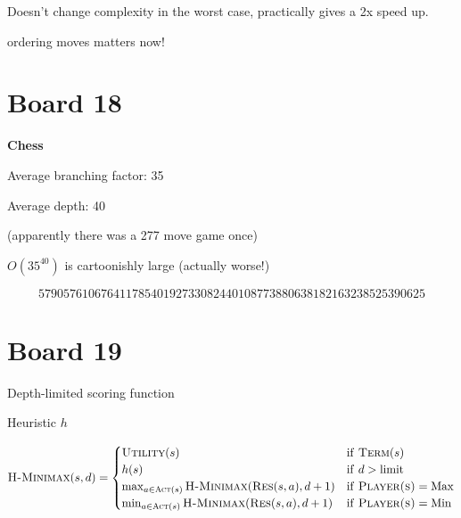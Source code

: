 \documentclass[11pt]{article}
\begin{document}
\begin{algorithm}
\begin{algorithmic}[1]

  \EndIf{}
  \EndFor{}
  
  \EndIf{}
  \EndFor{}
  \EndIf{}
  \EndProcedure{}
\end{algorithmic}
\end{algorithm}

Doesn't change complexity in the worst case, practically gives a 2x speed up. 

ordering moves matters now!

\section{Board 18}

\textbf{Chess} 

Average branching factor: 35

Average depth: 40

(apparently there was a 277 move game once)


$O(35^{40})$ is cartoonishly large (actually worse!) 

\[ 57905761067641178540192733082440108773880638182163238525390625\] 

\section{Board 19}

Depth-limited scoring function

Heuristic $h$

\[ \mathrm{\textsc{H-Minimax}}(s, d) = \begin{cases} 
  \mathrm{\textsc{Utility}}(s) & \mathrm{if\ } \mathrm{\textsc{Term}}(s)  \\
  h(s) & \mathrm{if\ } d > \mathrm{limit}   \\
  \max_{a \in \mathrm{\textsc{Act}}(s) } \mathrm{\textsc{H-Minimax}}(\mathrm{\textsc{Res}}(s, a), d+1) & \mathrm{if\ } \mathrm{\textsc{Player(s)}} = \mathrm{Max}  \\
  \min_{a \in \mathrm{\textsc{Act}}(s) } \mathrm{\textsc{H-Minimax}}(\mathrm{\textsc{Res}}(s, a), d+1) & \mathrm{if\ } \mathrm{\textsc{Player(s)}} = \mathrm{Min} \end{cases}\] 
\end{document}
